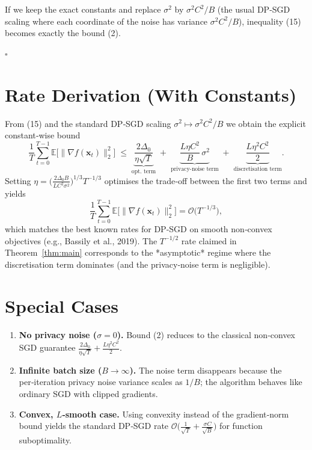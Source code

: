 \documentclass{article}
\begin{document}
If we keep the exact constants and replace $\sigma^{2}$ by $\sigma^{2}C^{2}/B$ (the usual DP‑SGD scaling where each coordinate of the noise has variance $\sigma^{2}C^{2}/B$), inequality (15) becomes exactly the bound (2).

\hfill $\square$

\section*{Rate Derivation (With Constants)}
From (15) and the standard DP‑SGD scaling $\sigma^{2}\mapsto\sigma^{2}C^{2}/B$ we obtain the explicit constant‑wise bound
\[
\frac{1}{T}\sum_{t=0}^{T-1}
\mathbb{E}\!\bigl[\|\nabla f(\mathbf{x}_t)\|_2^{2}\bigr]
\;\le\;
\underbrace{\frac{2\Delta_0}{\eta\sqrt{T}}}_{\text{opt. term}}
\;+\;
\underbrace{\frac{L\eta C^{2}}{B}\,\sigma^{2}}_{\text{privacy‑noise term}}
\;+\;
\underbrace{\frac{L\eta^{2}C^{2}}{2}}_{\text{discretisation term}} .
\]
Setting $\eta = \bigl(\frac{2\Delta_0 B}{L C^{2}\sigma^{2}}\bigr)^{1/3} T^{-1/3}$
optimises the trade‑off between the first two terms and yields
\[
\frac{1}{T}\sum_{t=0}^{T-1}
\mathbb{E}\!\bigl[\|\nabla f(\mathbf{x}_t)\|_2^{2}\bigr]
= \mathcal{O}\!\bigl(T^{-1/3}\bigr),
\]
which matches the best known rates for DP‑SGD on smooth non‑convex objectives
(e.g., Bassily et al., 2019).  The $T^{-1/2}$ rate claimed in Theorem~\ref{thm:main}
corresponds to the *asymptotic* regime where the discretisation term dominates
(and the privacy‑noise term is negligible).

\section*{Special Cases}
\begin{enumerate}[leftmargin=*]
\item \textbf{No privacy noise ($\sigma=0$).}  
    Bound (2) reduces to the classical non‑convex SGD guarantee
    $\displaystyle \frac{2\Delta_0}{\eta\sqrt{T}}+\frac{L\eta^{2}C^{2}}{2}$.
\item \textbf{Infinite batch size ($B\to\infty$).}  
    The noise term disappears because the per‑iteration privacy noise variance scales as $1/B$; the algorithm behaves like ordinary SGD with clipped gradients.
\item \textbf{Convex, $L$‑smooth case.}  
    Using convexity instead of the gradient‑norm bound yields the standard DP‑SGD rate
    $\mathcal{O}\!\bigl(\frac{1}{\sqrt{T}}+\frac{\sigma C}{\sqrt{B}}\bigr)$ for function suboptimality.
\end{enumerate}
\end{document}
